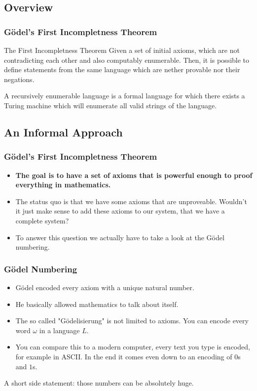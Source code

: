 \documentclass[aspectratio=169]{beamer}
\begin{document}
\subsection{Overview}
\begin{frame}
	\frametitle{Gödel's First Incompletness Theorem}
	\begin{block}{The First Incompletness Theorem}
		Given a set of initial axioms, which are not contradicting each other and also computably enumerable. Then, it is possible to define statements from the same language which are nether provable nor their negations.
	\end{block}
	\begin{Definition}
	A recursively enumerable language is a formal language for which there exists a Turing machine which will enumerate all valid strings of the language.
	\end{Definition}
\end{frame}
\begin{frame}
\subsection{An Informal Approach}
	\frametitle{Gödel's First Incompletness Theorem}
	\begin{itemize}
		\item \textbf{The goal is to have a set of axioms that is powerful enough to proof everything in mathematics.}
		\item The status quo is that we have some axioms that are unproveable. Wouldn't it just make sense to add these axioms to our system, that we have a complete system?
		\item To answer this question we actually have to take a look at the Gödel numbering.
	\end{itemize}
\end{frame}
\begin{frame}
	\frametitle{Gödel Numbering}
	\begin{itemize}
		\item Gödel encoded every axiom with a unique natural number.
		\item He basically allowed mathematics to talk about itself.
		\item The so called "Gödelisierung" is not limited to axioms. You can encode every word $\omega$ in a language $L$.
		\item You can compare this to a modern computer, every text you type is encoded, for example in ASCII. In the end it comes even down to an encoding of $0$s and $1$s.
	\end{itemize}
	A short side statement: those numbers can be absolutely huge.
\end{frame}
\end{document}
